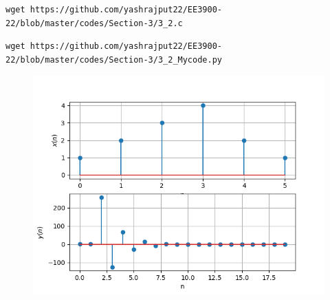 \documentclass[journal,12pt,twocolumn]{IEEEtran}
\renewcommand\thesection{\arabic{section}}
\begin{document}
\begin{enumerate}[label=\thesection.\arabic*,ref=\thesection.\theenumi]
\begin{lstlisting}
wget https://github.com/yashrajput22/EE3900-22/blob/master/codes/Section-3/3_2.c
\end{lstlisting}
\begin{lstlisting}
wget https://github.com/yashrajput22/EE3900-22/blob/master/codes/Section-3/3_2_Mycode.py
\end{lstlisting}
\begin{figure}[!ht]
\begin{center}
\includegraphics[width=\columnwidth]{./figs/3_2_Graph}
\end{center}
\label{fig:xnyn}	
\end{figure}
\end{enumerate}
\end{document}
